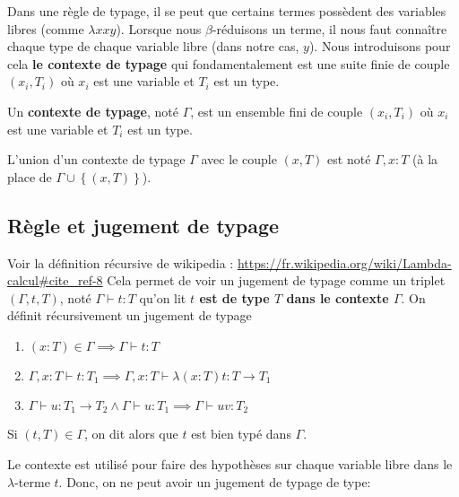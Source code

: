 Dans une règle de typage, il se peut que certains termes possèdent des variables
libres (comme $\lambda x x y$). Lorsque nous $\beta$-réduisons un terme, il nous
faut connaître chaque type de chaque variable libre (dans notre cas, $y$). Nous
introduisons pour cela \textbf{le contexte de typage} qui fondamentalement est
une suite finie de couple $(x_{i}, T_{i})$ où $x_{i}$ est une variable et
$T_{i}$ est un type.

\begin{definition} 
  Un \textbf{contexte de typage}, noté $\Gamma$, est un ensemble fini de couple $(x_{i},
  T_{i})$ où $x_{i}$ est une variable et $T_{i}$ est un type.
  
  L'union d'un contexte de typage $\Gamma$ avec le couple $(x, T)$ est noté
  $\Gamma, x : T$ (à la place de $\Gamma \cup \left\{(x, T)\right\}$).
\end{definition}

\subsection*{Règle et jugement de typage}

\begin{definition} 
  Voir la définition récursive de wikipedia :
  \url{https://fr.wikipedia.org/wiki/Lambda-calcul#cite_ref-8}
  Cela permet de voir un jugement de typage comme un triplet $(\Gamma, t, T)$,
  noté $\Gamma \vdash t : T$ qu'on lit \textbf{$t$ est de type $T$ dans le
    contexte $\Gamma$}.
  On définit récursivement un jugement de typage
  \begin{enumerate}
  \item $(x : T) \in \Gamma \implies \Gamma \vdash t : T$
  \item $\Gamma, x : T \vdash t : T_{1} \implies \Gamma, x : T \vdash \lambda (x
    : T) t : T \rightarrow T_{1}$
  \item $\Gamma \vdash u : T_{1} \rightarrow T_{2} \wedge \Gamma \vdash u :
    T_{1} \implies \Gamma \vdash uv : T_{2}$
  \end{enumerate}

   Si $(t, T) \in \Gamma$, on dit alors que $t$ est bien typé dans $\Gamma$.
\end{definition}

Le contexte est utilisé pour faire des hypothèses sur chaque variable libre dans
le $\lambda$-terme $t$. Donc, on ne peut avoir un jugement de typage de type:

